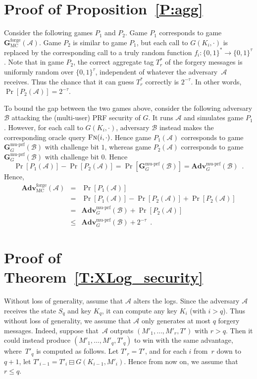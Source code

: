 \documentclass[sigconf]{sty/acmart}
\newcommand{\bits}{\{0, 1\}}
\newcommand{\advA}{{\mathcal A}}
\newcommand{\muprf}{\mathrm{mu}\textrm{-}\mathrm{prf}}
\newcommand{\Adv}{\mathbf{Adv}}
\renewcommand{\Game}{\mathbf{G}}
\newcommand{\FnO}{\textsc{Fn}}
\newcommand{\advB}{{\mathcal B}}
\newcommand{\thref}[1]{Theorem~\ref{#1}}
\newcommand{\forge}{\mathrm{forge}}
\newcommand{\AMAC}{\mathrm{MC}}
\newcommand{\combinv}{\boxminus}
\newcommand{\propref}[1]{Proposition~\ref{#1}}
\begin{document}
\balance

{\footnotesize\setlength{\bibsep}{3pt}
}



\begin{appendix}
    
\section{Proof of \propref{P:agg}} \label{A:agg_security_proof} 

Consider the following games $P_1$ and $P_2$. 
Game $P_1$ corresponds to game  $\Game^{\forge}_{\AMAC}(\advA)$. 
Game $P_2$ is similar to game $P_1$, but each call to $G(K_i, \cdot)$ is replaced
by the corresponding call to a truly random function $f_i: \bits^* \to \bits^\tau$. 
 Note that in game $P_2$, the correct aggregate tag $T^*_r$ of the forgery messages is uniformly random over $\bits^\tau$, independent of whatever the adversary~$\advA$ receives.
    Thus the chance that it can guess $T^*_r$ correctly is $2^{-\tau}$. In other words, $\Pr[P_2(\advA)] = 2^{-\tau}$.


To bound the gap between the two games above, consider the following adversary $\advB$ attacking the (multi-user) PRF security of $G$. 
It runs $\advA$ and simulates game $P_1$. 
However, for each call to $G(K_i, \cdot)$, adversary $\advB$ instead makes the corresponding oracle query $\FnO(i, \cdot)$. 
Hence game $P_1(\advA)$ corresponds to  game $\Game^{\muprf}_G(\advB)$ with challenge bit $1$, 
whereas game $P_2(\advA)$ corresponds to game $\Game^{\muprf}_G(\advB)$ with challenge bit $0$. 
Hence 
\[ 
\Pr[P_1(\advA)] - \Pr[P_2(\advA)] = \Pr[\Game^{\muprf}_G(\advB)] = \Adv^{\muprf}_G(\advB) \enspace. 
\] 
Hence, 
\begin{eqnarray*}
\Adv^{\forge}_\AMAC(\advA)  &=& \Pr[P_1(\advA)]  \\
&=& \Pr[P_1(\advA)] - \Pr[P_2(\advA)] + \Pr[P_2(\advA)] \\
&=& \Adv^{\muprf}_G(\advB)  + \Pr[P_2(\advA)] \\
&\leq& \Adv^{\muprf}_G(\advB) + 2^{-\tau} \enspace. 
\end{eqnarray*}


\section{Proof of \thref{T:XLog_security}} \label{A:XLog_security_proof}
    
       Without loss of generality, assume that $\advA$ alters the logs. 
    Since the adversary $\advA$ receives the state $S_{q}$ and key $K_{q}$, it can compute any  key $K_i$ (with $i > q$).
    Thus without loss of generality, we assume that $\advA$ only generates at most $q$ forgery messages.
    Indeed, suppose that~$\advA$ outputs $(M'_1, \ldots, M'_r, T')$ with $r > q$.
    Then it could  instead produce $(M'_1, \ldots, M'_q, T'_q)$ to win with the same advantage,
		where~$T'_q$ is computed as follows. Let $T'_r = T'$, and for each $i$ from~$r$ down to $q + 1$, let $T'_{i - 1} = T'_i \combinv G(K_{i - 1}, M'_i)$. 
		Hence from now on, we assume that $r \leq q$.


\end{appendix}
\end{document}
